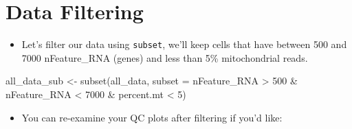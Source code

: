 \documentclass[
  letterpaper,
  DIV=11,
  numbers=noendperiod]{scrreprt}
\newenvironment{Shaded}{\begin{snugshade}}{\end{snugshade}}
\newcommand{\AttributeTok}[1]{\textcolor[rgb]{0.40,0.45,0.13}{#1}}
\newcommand{\DecValTok}[1]{\textcolor[rgb]{0.68,0.00,0.00}{#1}}
\newcommand{\FunctionTok}[1]{\textcolor[rgb]{0.28,0.35,0.67}{#1}}
\newcommand{\NormalTok}[1]{\textcolor[rgb]{0.00,0.23,0.31}{#1}}
\newcommand{\OtherTok}[1]{\textcolor[rgb]{0.00,0.23,0.31}{#1}}
\newcommand{\SpecialCharTok}[1]{\textcolor[rgb]{0.37,0.37,0.37}{#1}}
\providecommand{\tightlist}{%
  \setlength{\itemsep}{0pt}\setlength{\parskip}{0pt}}
\begin{document}
\section{Data Filtering}\label{data-filtering}

\begin{itemize}
\tightlist
\item
  Let's filter our data using \texttt{subset}, we'll keep cells that
  have between 500 and 7000 nFeature\_RNA (genes) and less than 5\%
  mitochondrial reads.
\end{itemize}

\begin{Shaded}
\begin{Highlighting}[]
\NormalTok{all\_data\_sub }\OtherTok{\textless{}{-}} \FunctionTok{subset}\NormalTok{(all\_data, }\AttributeTok{subset =}\NormalTok{ nFeature\_RNA }\SpecialCharTok{\textgreater{}} \DecValTok{500} \SpecialCharTok{\&}\NormalTok{ nFeature\_RNA }\SpecialCharTok{\textless{}} \DecValTok{7000} \SpecialCharTok{\&}\NormalTok{ percent.mt }\SpecialCharTok{\textless{}} \DecValTok{5}\NormalTok{)}
\end{Highlighting}
\end{Shaded}

\begin{itemize}
\tightlist
\item
  You can re-examine your QC plots after filtering if you'd like:
\end{itemize}
\end{document}
